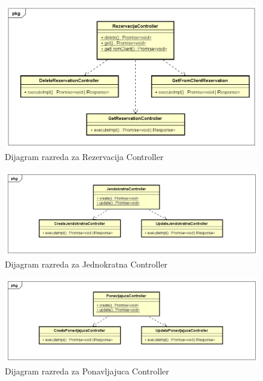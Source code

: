 		\begin{figure}[H]
			\includegraphics[width=1\linewidth]{dijagrami/Dijagram razreda - RezervacijaController.png}
			\caption{Dijagram razreda za Rezervacija Controller}
			\label{fig:Dijagram razreda - RezervacijaController} 
		\end{figure}
		
		\begin{figure}[H]
			\includegraphics[width=1\linewidth]{dijagrami/Dijagram razreda - JednokratnaController.png}
			\caption{Dijagram razreda za Jednokratna Controller}
			\label{fig:Dijagram razreda - JednokratnaController} 
		\end{figure}
		
		\begin{figure}[H]
			\includegraphics[width=1\linewidth]{dijagrami/Dijagram razreda - PonavljajucaController.png}
			\caption{Dijagram razreda za Ponavljajuca Controller}
			\label{fig:Dijagram razreda - PonavljajucaController} 
		\end{figure}
		
